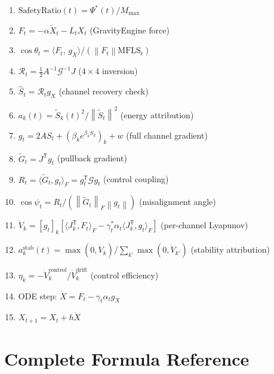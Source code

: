 \documentclass[11pt,a4paper]{article}
\theoremstyle{definition}
\newcommand{\T}{^{\mathsf{T}}}
\newcommand{\norm}[1]{\left\|#1\right\|}
\newcommand{\inner}[2]{\langle #1,\,#2\rangle}
\newcommand{\gX}{g_X}
\newcommand{\mfls}{\mathrm{MFLS}}
\begin{document}
\begin{enumerate}
\item $\text{SafetyRatio}(t) = \Psi^*(t)/M_\mathrm{max}$

\item $F_t = -\alpha\tilde X_t - L_tX_t$ \hfill (GravityEngine force)

\item $\cos\theta_t = \inner{F_t}{\gX}/(\norm{F_t}\mfls_t)$

\item $\mathcal{R}_t = \frac{1}{2}A^{-1}\mathcal{G}^{-1}J$ \hfill ($4\times4$ inversion)

\item $\hat S_t = \mathcal{R}_t\gX$ \hfill (channel recovery check)

\item $a_k(t) = \tilde S_k(t)^2/\norm{\tilde S_t}^2$ \hfill (energy attribution)

\item $g_t = 2AS_t + (\beta_k e^{\beta_k S_k})_k + w$ \hfill (full channel gradient)

\item $\tilde G_t = J\T g_t$ \hfill (pullback gradient)

\item $R_t = \langle\tilde G_t, g_t\rangle_F = g_t\T\mathcal{G}g_t$ \hfill (control coupling)

\item $\cos\psi_t = R_t/(\norm{\tilde G_t}_F\norm{g_t})$ \hfill (misalignment angle)

\item $\dot V_k = [g_t]_k[\langle J_k\T,F_t\rangle_F - \gamma^*_t\alpha_t\langle J_k\T,g_t\rangle_F]$ \hfill (per-channel Lyapunov)

\item $a_k^\mathrm{stab}(t) = \max(0,\dot V_k)/\sum_{k'}\max(0,\dot V_{k'})$ \hfill (stability attribution)

\item $\eta_k = -\dot V_k^\mathrm{control}/\dot V_k^\mathrm{drift}$ \hfill (control efficiency)

\item ODE step: $\dot X = F_t - \gamma_t\alpha_t\gX$

\item $X_{t+1} = X_t + h\dot X$
\end{enumerate}

\section{Complete Formula Reference}
\end{document}

